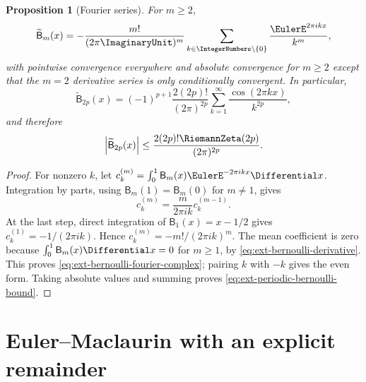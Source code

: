 \documentclass[11pt,a4paper,oneside,openany]{book}
\newtheorem{proposition}[theorem]{Proposition}
\theoremstyle{definition}
\theoremstyle{remark}
\begin{document}
\begin{proposition}[Fourier series]
For \(m\ge2\),
\begin{equation}\label{eq:ext-bernoulli-fourier-complex}
 \widetilde{\mathsf B}_m(x)
 =-\frac{m!}{(2\pi \ImaginaryUnit)^m}
 \sum_{k\in\IntegerNumbers\setminus\{0\}}\frac{\EulerE^{2\pi ikx}}{k^m},
\end{equation}
with pointwise convergence everywhere and absolute convergence for \(m\ge2\)
except that the \(m=2\) derivative series is only conditionally convergent.  In
particular,
\begin{equation}\label{eq:ext-bernoulli-fourier-even}
 \widetilde{\mathsf B}_{2p}(x)
 =(-1)^{p+1}\frac{2(2p)!}{(2\pi)^{2p}}
 \sum_{k=1}^\infty\frac{\cos(2\pi kx)}{k^{2p}},
\end{equation}
and therefore
\begin{equation}\label{eq:ext-periodic-bernoulli-bound}
 \left|\widetilde{\mathsf B}_{2p}(x)\right|
 \le\frac{2(2p)!\RiemannZeta(2p)}{(2\pi)^{2p}}.
\end{equation}
\end{proposition}
\begin{proof}
For nonzero \(k\), let
\(c_k^{(m)}=\int_0^1\mathsf B_m(x)\EulerE^{-2\pi ikx}\Differential x\).  Integration by
parts, using \(\mathsf B_m(1)=\mathsf B_m(0)\) for \(m\ne1\), gives
\[
 c_k^{(m)}=\frac{m}{2\pi ik}c_k^{(m-1)}.
\]
At the last step, direct integration of \(\mathsf B_1(x)=x-1/2\) gives
\(c_k^{(1)}=-1/(2\pi ik)\).  Hence
\(c_k^{(m)}=-m!/(2\pi ik)^m\).  The mean coefficient is zero because
\(\int_0^1\mathsf B_m(x)\Differential x=0\) for \(m\ge1\), by
\eqref{eq:ext-bernoulli-derivative}.  This proves
\eqref{eq:ext-bernoulli-fourier-complex}; pairing \(k\) with \(-k\) gives the
even form.  Taking absolute values and summing proves
\eqref{eq:ext-periodic-bernoulli-bound}.
\end{proof}

\section{Euler--Maclaurin with an explicit remainder}
\end{document}

